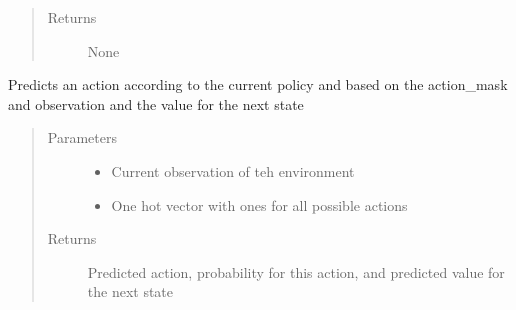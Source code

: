 \documentclass[letterpaper,10pt,english]{sphinxmanual}
\begin{document}
\begin{fulllineitems}
\begin{fulllineitems}
\begin{quote}
\begin{description}
\item[{Returns}] \leavevmode
\sphinxAtStartPar
None

\end{description}\end{quote}

\end{fulllineitems}


\begin{fulllineitems}
\label{\detokenize{agents.reinforcement_learning:agents.reinforcement_learning.ppo_masked.MaskedPPO.forward}}
\sphinxAtStartPar
Predicts an action according to the current policy and based on the action\_mask and observation
and the value for the next state
\begin{quote}\begin{description}
\item[{Parameters}] \leavevmode\begin{itemize}
\item {} 
\sphinxAtStartPar
{} \textendash{} Current observation of teh environment

\item {} 
\sphinxAtStartPar
{} \textendash{} One hot vector with ones for all possible actions

\end{itemize}

\item[{Returns}] \leavevmode
\sphinxAtStartPar
Predicted action, probability for this action, and predicted value for the next state

\end{description}\end{quote}

\end{fulllineitems}



\end{fulllineitems}
\end{document}
